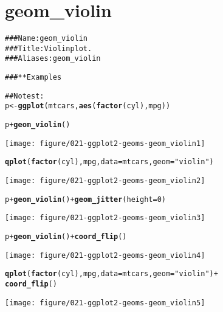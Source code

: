 \documentclass[a4paper,titlepage]{tufte-handout}\usepackage{graphicx, color}
\makeatletter
\def\maxwidth{ %
  \ifdim\Gin@nat@width>\linewidth
    \linewidth
  \else
    \Gin@nat@width
  \fi
}
\newcommand{\hlfunctioncall}[1]{\textcolor[rgb]{0.501960784313725,0,0.329411764705882}{\textbf{#1}}}%
\newcommand{\hlstring}[1]{\textcolor[rgb]{0.6,0.6,1}{#1}}%
\newcommand{\hlcomment}[1]{\textcolor[rgb]{0.180392156862745,0.6,0.341176470588235}{#1}}%
\newenvironment{kframe}{%
 \def\at@end@of@kframe{}%
 \ifinner\ifhmode%
  \def\at@end@of@kframe{\end{minipage}}%
  \begin{minipage}{\columnwidth}%
 \fi\fi%
 \def\FrameCommand##1{\hskip\@totalleftmargin \hskip-\fboxsep
 \colorbox{shadecolor}{##1}\hskip-\fboxsep
     \hskip-\linewidth \hskip-\@totalleftmargin \hskip\columnwidth}%
 \MakeFramed {\advance\hsize-\width
   \@totalleftmargin\z@ \linewidth\hsize
   \@setminipage}}%
 {\par\unskip\endMakeFramed%
 \at@end@of@kframe}
\newenvironment{knitrout}{}{} %
\makeatother
\begin{document}
\begin{knitrout}
\begin{kframe}
\begin{alltt}
\end{alltt}
\end{kframe}
\end{knitrout}



\section{geom\_violin}

\begin{knitrout}
\color{fgcolor}\begin{kframe}
\begin{alltt}
\hlcomment{### Name: geom_violin}
\hlcomment{### Title: Violin plot.}
\hlcomment{### Aliases: geom_violin}

\hlcomment{### ** Examples}

\hlcomment{## No test: }
p <- \hlfunctioncall{ggplot}(mtcars, \hlfunctioncall{aes}(\hlfunctioncall{factor}(cyl), mpg))

p + \hlfunctioncall{geom_violin}()
\end{alltt}
\end{kframe}
\texttt{[image: figure/021-ggplot2-geoms-geom\_violin1]} 
\begin{kframe}\begin{alltt}
\hlfunctioncall{qplot}(\hlfunctioncall{factor}(cyl), mpg, data = mtcars, geom = \hlstring{"violin"})
\end{alltt}
\end{kframe}
\texttt{[image: figure/021-ggplot2-geoms-geom\_violin2]} 
\begin{kframe}\begin{alltt}

p + \hlfunctioncall{geom_violin}() + \hlfunctioncall{geom_jitter}(height = 0)
\end{alltt}
\end{kframe}
\texttt{[image: figure/021-ggplot2-geoms-geom\_violin3]} 
\begin{kframe}\begin{alltt}
p + \hlfunctioncall{geom_violin}() + \hlfunctioncall{coord_flip}()
\end{alltt}
\end{kframe}
\texttt{[image: figure/021-ggplot2-geoms-geom\_violin4]} 
\begin{kframe}\begin{alltt}
\hlfunctioncall{qplot}(\hlfunctioncall{factor}(cyl), mpg, data = mtcars, geom = \hlstring{"violin"}) +
  \hlfunctioncall{coord_flip}()
\end{alltt}
\end{kframe}
\texttt{[image: figure/021-ggplot2-geoms-geom\_violin5]} 
\begin{kframe}\begin{alltt}


\end{alltt}
\end{kframe}
\end{knitrout}
\end{document}
